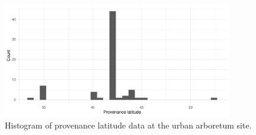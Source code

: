 \documentclass{article}\usepackage[]{graphicx}\usepackage[]{color}
\begin{document}
\begin{figure}[H]
      \centering
      \includegraphics[width=10cm]{..//analyses/figures/prov_hist.pdf}
\caption{ Histogram of provenance latitude data at the urban arboretum site.}
\label{fig:provhist}
\end{figure}


  
\end{document}
